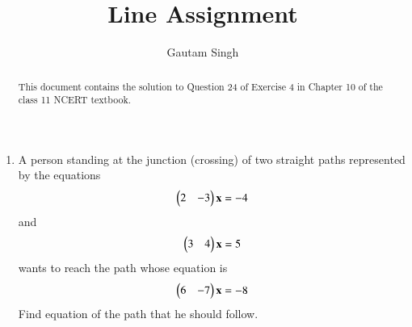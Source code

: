\documentclass[journal,12pt,twocolumn]{IEEEtran}
\let\vec\mathbf
\begin{document}
\vspace{3cm}
\title{Line Assignment}
\author{Gautam Singh}
\maketitle
\bigskip

\begin{abstract}
    This document contains the solution to Question 24 of Exercise 4 
    in Chapter 10 of the class 11 NCERT textbook.
\end{abstract}

\begin{enumerate}
    \item A person standing at the junction (crossing) of two straight paths 
    represented by the equations 
    \begin{align}
        \myvec{2&-3}\vec{x} = -4 
        \label{eq:L1}
    \end{align}
    and
    \begin{align}
        \myvec{3&4}\vec{x} = 5
        \label{eq:L2}
    \end{align} 
    wants to reach the path whose equation is 
    \begin{align}
        \myvec{6&-7}\vec{x} = -8
        \label{eq:L3}
    \end{align}
    Find equation of the path that he should follow.


\end{enumerate}
\end{document}
